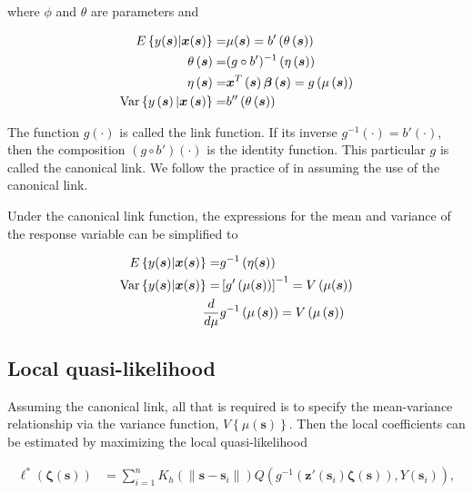 \documentclass[english]{article}\usepackage[]{graphicx}\usepackage[]{color}
\theoremstyle{plain}
\theoremstyle{plain}
\begin{document}
where $\phi$ and $\theta$ are parameters and

\begin{align*}
E\left\{ y(\bm{s})|\bm{x}(\bm{s})\right\} = & \mu(\bm{s})=b'\left(\theta\left(\bm{s}\right)\right)\\
\theta\left(\bm{s}\right)= & (g\circ b')^{-1}\left(\eta\left(\bm{s}\right)\right)\\
\eta\left(\bm{s}\right)= & \bm{x}^{T}\left(\bm{s}\right)\bm{\beta}\left(\bm{s}\right)=g\left(\mu\left(\bm{s}\right)\right)\\
\text{\text{Var}}\left\{ y\left(\bm{s}\right)|\bm{x}\left(\bm{s}\right)\right\} = & b''\left(\theta\left(\bm{s}\right)\right)
\end{align*}


The function $g(\cdot)$ is called the link function. If its inverse
$g^{-1}(\cdot)=b'(\cdot)$, then the composition $\left(g\circ b'\right)\left(\cdot\right)$
is the identity function. This particular $g$ is called the canonical
link. We follow the practice of \citet{Fan-Heckman-Wand-1995} in
assuming the use of the canonical link.

Under the canonical link function, the expressions for the mean and
variance of the response variable can be simplified to

\begin{align*}
E\left\{ y(\bm{s})|\bm{x}(\bm{s})\right\} = & g^{-1}\left(\eta(\bm{s})\right)\\
\text{\text{Var}}\left\{ y(\bm{s})|\bm{x}(\bm{s})\right\} = & \left[g'\left(\mu(\bm{s})\right)\right]^{-1}=V\left(\mu(\bm{s})\right)\\
\frac{d}{d\mu} & g^{-1}\left(\mu\left(\bm{s}\right)\right)=V\left(\mu\left(\bm{s}\right)\right)
\end{align*}
 


\subsection{Local quasi-likelihood}

Assuming the canonical link, all that is required is to specify the
mean-variance relationship via the variance function, $V\left\{ \mu(\bm{s})\right\} $.
Then the local coefficients can be estimated by maximizing the local
quasi-likelihood 

\begin{align}
\mathcal{\ell}^{*}\left(\bm{\zeta}(\bm{s})\right) & =\sum_{i=1}^{n}K_{h}\left(\|\bm{s}-\bm{s}_{i}\|\right)Q\left(g^{-1}\left(\bm{z}'(\bm{s}_{i})\bm{\zeta}(\bm{s})\right),Y(\bm{s}_{i})\right),
\end{align}
\end{document}
